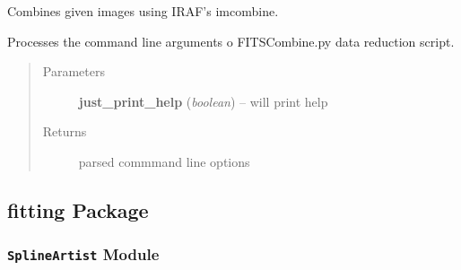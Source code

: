 \documentclass[letterpaper,10pt,english]{sphinxmanual}
\begin{document}

\begin{fulllineitems}
\label{SamPy.fits:SamPy.fits.combine.combinePyraf}
Combines given images using IRAF's imcombine.

\end{fulllineitems}



\begin{fulllineitems}
\label{SamPy.fits:SamPy.fits.combine.process_args}
Processes the command line arguments o FITSCombine.py data reduction script.
\begin{quote}\begin{description}
\item[{Parameters}] \leavevmode
\textbf{just\_print\_help} (\emph{boolean}) -- will print help

\item[{Returns}] \leavevmode
parsed commmand line options

\end{description}\end{quote}

\end{fulllineitems}



\subsection{fitting Package}
\label{SamPy.fitting::doc}\label{SamPy.fitting:fitting-package}

\subsubsection{\texttt{SplineArtist} Module}
\label{SamPy.fitting:splineartist-module}\label{SamPy.fitting:module-SamPy.fitting.SplineArtist}
\end{document}
